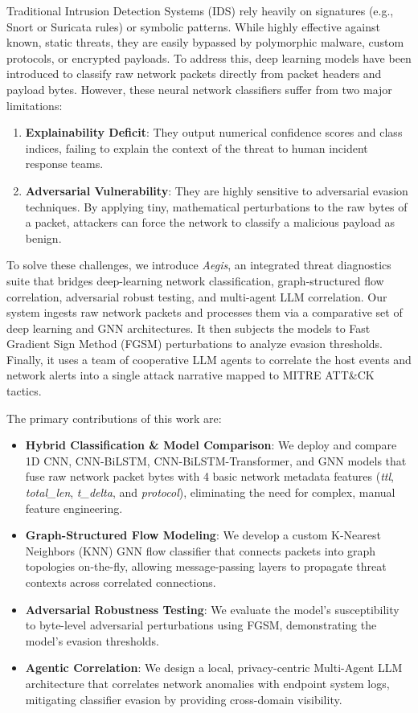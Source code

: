 \documentclass[journal,twoside]{IEEEtran}
\begin{document}
Traditional Intrusion Detection Systems (IDS) rely heavily on signatures (e.g., Snort or Suricata rules) or symbolic patterns. While highly effective against known, static threats, they are easily bypassed by polymorphic malware, custom protocols, or encrypted payloads. To address this, deep learning models have been introduced to classify raw network packets directly from packet headers and payload bytes. However, these neural network classifiers suffer from two major limitations:
\begin{enumerate}
    \item \textbf{Explainability Deficit}: They output numerical confidence scores and class indices, failing to explain the context of the threat to human incident response teams.
    \item \textbf{Adversarial Vulnerability}: They are highly sensitive to adversarial evasion techniques. By applying tiny, mathematical perturbations to the raw bytes of a packet, attackers can force the network to classify a malicious payload as benign.
\end{enumerate}

To solve these challenges, we introduce \textit{Aegis}, an integrated threat diagnostics suite that bridges deep-learning network classification, graph-structured flow correlation, adversarial robust testing, and multi-agent LLM correlation. Our system ingests raw network packets and processes them via a comparative set of deep learning and GNN architectures. It then subjects the models to Fast Gradient Sign Method (FGSM) perturbations to analyze evasion thresholds. Finally, it uses a team of cooperative LLM agents to correlate the host events and network alerts into a single attack narrative mapped to MITRE ATT\&CK tactics. 

The primary contributions of this work are:
\begin{itemize}
    \item \textbf{Hybrid Classification \& Model Comparison}: We deploy and compare 1D CNN, CNN-BiLSTM, CNN-BiLSTM-Transformer, and GNN models that fuse raw network packet bytes with 4 basic network metadata features (\textit{ttl}, \textit{total\_len}, \textit{t\_delta}, and \textit{protocol}), eliminating the need for complex, manual feature engineering.
    \item \textbf{Graph-Structured Flow Modeling}: We develop a custom K-Nearest Neighbors (KNN) GNN flow classifier that connects packets into graph topologies on-the-fly, allowing message-passing layers to propagate threat contexts across correlated connections.
    \item \textbf{Adversarial Robustness Testing}: We evaluate the model's susceptibility to byte-level adversarial perturbations using FGSM, demonstrating the model's evasion thresholds.
    \item \textbf{Agentic Correlation}: We design a local, privacy-centric Multi-Agent LLM architecture that correlates network anomalies with endpoint system logs, mitigating classifier evasion by providing cross-domain visibility.
\end{itemize}
\end{document}
